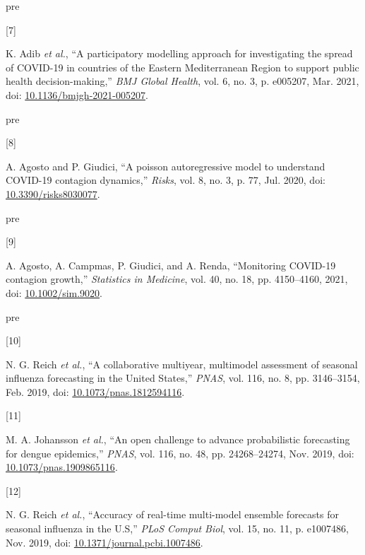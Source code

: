 \documentclass[
]{article}
\newlength{\cslhangindent}
\newlength{\csllabelwidth}
\newlength{\cslentryspacingunit} %
\newenvironment{CSLReferences}[2] %
 {%
  \setlength{\parindent}{0pt}
  \ifodd #1
  \let\oldpar\par
  \def\par{\hangindent=\cslhangindent\oldpar}
  \fi
  \setlength{\parskip}{#2\cslentryspacingunit}
 }%
 {}
\newcommand{\CSLLeftMargin}[1]{\parbox[t]{\csllabelwidth}{#1}}
\newcommand{\CSLRightInline}[1]{\parbox[t]{\linewidth - \csllabelwidth}{#1}\break}
\providecommand{\DIFaddtex}[1]{{\protect\color{blue}\uwave{#1}}} %
\providecommand{\DIFaddbegin}{} %
\providecommand{\DIFaddend}{} %
\providecommand{\DIFdelbegin}{} %
\providecommand{\DIFdelend}{} %
\providecommand{\DIFadd}[1]{\texorpdfstring{\DIFaddtex{#1}}{#1}} %
\newcommand{\DIFscaledelfig}{0.5}
\newlength{\DIFdelgraphicswidth} %
\newlength{\DIFdelgraphicsheight} %
\newcommand{\DIFaddincludegraphics}[2][]{{\color{blue}\fbox{\DIFOincludegraphics[#1]{#2}}}} %
\newcommand{\DIFdelincludegraphics}[2][]{%
\sbox{\DIFdelgraphicsbox}{\DIFOincludegraphics[#1]{#2}}%
\settoboxwidth{\DIFdelgraphicswidth}{\DIFdelgraphicsbox} %
\settoboxtotalheight{\DIFdelgraphicsheight}{\DIFdelgraphicsbox} %
\scalebox{\DIFscaledelfig}{%
\parbox[b]{\DIFdelgraphicswidth}{\usebox{\DIFdelgraphicsbox}\\[-\baselineskip] \rule{\DIFdelgraphicswidth}{0em}}\llap{\resizebox{\DIFdelgraphicswidth}{\DIFdelgraphicsheight}{%
\setlength{\unitlength}{\DIFdelgraphicswidth}%
\begin{picture}(1,1)%
\thicklines\linethickness{2pt} %
{\color[rgb]{1,0,0}\put(0,0){\framebox(1,1){}}}%
{\color[rgb]{1,0,0}\put(0,0){\line( 1,1){1}}}%
{\color[rgb]{1,0,0}\put(0,1){\line(1,-1){1}}}%
\end{picture}%
}\hspace*{3pt}}} %
} %
\DeclareRobustCommand{\DIFaddbegin}{\DIFOaddbegin \let\includegraphics\DIFaddincludegraphics} %
\DeclareRobustCommand{\DIFaddend}{\DIFOaddend \let\includegraphics\DIFOincludegraphics} %
\DeclareRobustCommand{\DIFdelbegin}{\DIFOdelbegin \let\includegraphics\DIFdelincludegraphics} %
\DeclareRobustCommand{\DIFdelend}{\DIFOaddend \let\includegraphics\DIFOincludegraphics} %
\begin{document}
\begin{CSLReferences}{0}{0}
\leavevmode\vadjust \DIFadd{pre}{\hypertarget{ref-adibParticipatoryModellingApproach2021}{}}%
\CSLLeftMargin{{[}7{]} }
\CSLRightInline{K. Adib \emph{et al.}, {``A participatory modelling approach for investigating the spread of {COVID-19} in countries of the {Eastern Mediterranean Region} to support public health decision-making,''} \emph{BMJ Global Health}, vol. 6, no. 3, p. e005207, Mar. 2021, doi: \href{https://doi.org/10.1136/bmjgh-2021-005207}{10.1136/bmjgh-2021-005207}.}

\leavevmode\vadjust \DIFadd{pre}{\hypertarget{ref-Agosto2020}{}}%
\CSLLeftMargin{{[}8{]} }
\CSLRightInline{A. Agosto and P. Giudici, {``A poisson autoregressive model to understand COVID-19 contagion dynamics,''} \emph{Risks}, vol. 8, no. 3, p. 77, Jul. 2020, doi: \href{https://doi.org/10.3390/risks8030077}{10.3390/risks8030077}.}

\leavevmode\vadjust \DIFadd{pre}{\hypertarget{ref-agostoMonitoringCOVID19Contagion2021}{}}%
\CSLLeftMargin{{[}9{]} }
\CSLRightInline{A. Agosto, A. Campmas, P. Giudici, and A. Renda, {``Monitoring {COVID-19} contagion growth,''} \emph{Statistics in Medicine}, vol. 40, no. 18, pp. 4150--4160, 2021, doi: \href{https://doi.org/10.1002/sim.9020}{10.1002/sim.9020}.}

\leavevmode\vadjust \DIFadd{pre}{\hypertarget{ref-reichCollaborativeMultiyearMultimodel2019}{}}%
\CSLLeftMargin{{[}10{]} }
\DIFaddend \CSLRightInline{N. G. Reich \emph{et al.}, {``A collaborative multiyear, multimodel assessment of seasonal influenza forecasting in the {United States},''} \emph{PNAS}, vol. 116, no. 8, pp. 3146--3154, Feb. 2019, doi: \href{https://doi.org/10.1073/pnas.1812594116}{10.1073/pnas.1812594116}.}

\leavevmode{}%
\DIFdelbegin %
\DIFdelend \DIFaddbegin \CSLLeftMargin{{[}11{]} }
\DIFaddend \CSLRightInline{M. A. Johansson \emph{et al.}, {``An open challenge to advance probabilistic forecasting for dengue epidemics,''} \emph{PNAS}, vol. 116, no. 48, pp. 24268--24274, Nov. 2019, doi: \href{https://doi.org/10.1073/pnas.1909865116}{10.1073/pnas.1909865116}.}

\leavevmode{}%
\DIFdelbegin %
\DIFdelend \DIFaddbegin \CSLLeftMargin{{[}12{]} }
\DIFaddend \CSLRightInline{N. G. Reich \emph{et al.}, {``Accuracy of real-time multi-model ensemble forecasts for seasonal influenza in the {U}.{S},''} \emph{PLoS Comput Biol}, vol. 15, no. 11, p. e1007486, Nov. 2019, doi: \href{https://doi.org/10.1371/journal.pcbi.1007486}{10.1371/journal.pcbi.1007486}.}


\end{CSLReferences}
\end{document}
